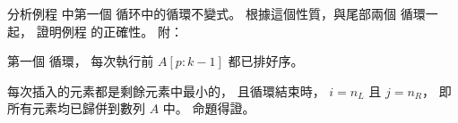 \startEXERCISE
分析例程  中第一個  循环中的循環不變式。
根據這個性質，與尾部兩個  循環一起，
證明例程  的正確性。
附：

\stopEXERCISE

\startANSWER
第一個  循環，
每次執行前 $A[p:k-1]$ 都已排好序。

每次插入的元素都是剩餘元素中最小的，
且循環結束時， $i=n_L$ 且 $j=n_R$，
即所有元素均已歸併到數列 $A$ 中。
命題得證。
\stopANSWER
